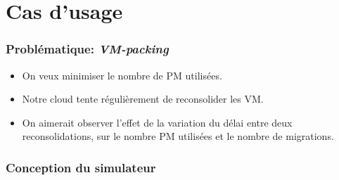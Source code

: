 \documentclass{beamer}
\begin{document}

\section{Cas d'usage}

\begin{frame}
	\frametitle{Problématique: \emph{VM-packing}}
	\begin{itemize}
		\item On veux minimiser le nombre de PM utilisées.
		\item Notre cloud tente régulièrement de reconsolider les VM.
		\item On aimerait observer l'effet de la variation du délai entre
			deux reconsolidations, sur le nombre PM utilisées et le
			nombre de migrations.
	\end{itemize}
\end{frame}

\begin{frame}
	\frametitle{Conception du simulateur}
	\resizebox{\textwidth}{!}{}	
\end{frame}

\end{document}
